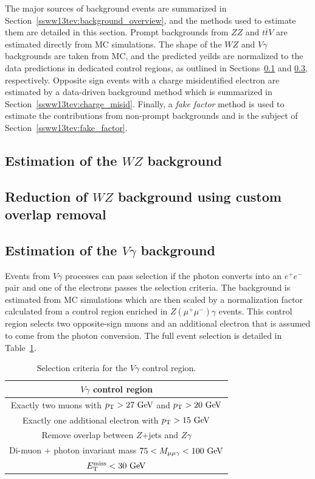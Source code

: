 The major sources of background events are summarized in Section~\ref{ssww13tev:background_overview}, and the methods used to estimate them are detailed in this section.  
Prompt backgrounds from $ZZ$ and $t\bar{t}V$ are estimated directly from MC simulations.
The shape of the $WZ$ and $V\gamma$ backgrounds are taken from MC, and the predicted yeilds are normalized to the data predictions in dedicated control regions, as outlined in Sections~\ref{ssww13tev:wz} and \ref{ssww13tev:wgamma}, respectively.
Opposite sign events with a charge misidentified electron are estimated by a data-driven background method which is summarized in Section~\ref{ssww13tev:charge_misid}.
Finally, a \emph{fake factor} method is used to estimate the contributions from non-prompt backgrounds and is the subject of Section~\ref{ssww13tev:fake_factor}.

\subsection{Estimation of the $WZ$ background}\label{ssww13tev:wz}

\subsection{Reduction of $WZ$ background using custom overlap removal}\label{ssww13tev:custom_or}


\subsection{Estimation of the $V\gamma$ background}\label{ssww13tev:wgamma}
Events from $V\gamma$ processes can pass selection if the photon converts into an $e^{+}e^{-}$ pair and one of the electrons passes the selection criteria.
The background is estimated from MC simulations which are then scaled by a normalization factor calculated from a control region enriched in $Z(\mu^{+}\mu^{-})\gamma$ events.
This control region selects two opposite-sign muons and an additional electron that is assumed to come from the photon conversion.
The full event selection is detailed in Table~\ref{tab:ssww13tev_vgamma_cr}.

\begin{table}[htbp]
  \centering
  \begin{tabular}{c}
    $V\gamma$ control region \\
    \hline\hline
    Exactly two muons with $\pt > 27\gev$ and $\pt > 20\gev$ \\
    Exactly one additional electron with $\pt > 15\gev$ \\
    Remove overlap between $Z$+jets and $Z\gamma$ \\
    Di-muon + photon invariant mass $75 < M_{\mu\mu\gamma} < 100\gev$ \\
    $\met < 30\gev$ \\
    \hline
  \end{tabular}
  \caption{Selection criteria for the $V\gamma$ control region.}
  \label{tab:ssww13tev_vgamma_cr}
\end{table}

